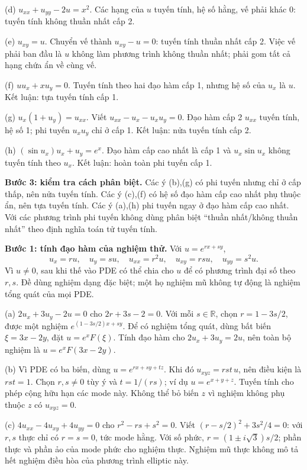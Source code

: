 (d) $u_{xx}+u_{yy}-2u=x^2$. Các hạng của $u$ tuyến tính, hệ số hằng, vế phải khác 0: tuyến tính không thuần nhất cấp 2.

(e) $u_{xy}=u$. Chuyển vế thành $u_{xy}-u=0$: tuyến tính thuần nhất cấp 2. Việc vế phải ban đầu là $u$ không làm phương trình không thuần nhất; phải gom tất cả hạng chứa ẩn về cùng vế.

(f) $uu_x+xu_y=0$. Tuyến tính theo hai đạo hàm cấp 1, nhưng hệ số của $u_x$ là $u$. Kết luận: tựa tuyến tính cấp 1.

(g) $u_x(1+u_y)=u_{xx}$. Viết $u_{xx}-u_x-u_xu_y=0$. Đạo hàm cấp 2 $u_{xx}$ tuyến tính, hệ số 1; phi tuyến $u_xu_y$ chỉ ở cấp 1. Kết luận: nửa tuyến tính cấp 2.

(h) $(\sin u_x)u_x+u_y=e^x$. Đạo hàm cấp cao nhất là cấp 1 và $u_x\sin u_x$ không tuyến tính theo $u_x$. Kết luận: hoàn toàn phi tuyến cấp 1.

\textbf{Bước 3: kiểm tra cách phân biệt.} Các ý (b),(g) có phi tuyến nhưng chỉ ở cấp thấp, nên nửa tuyến tính. Các ý (c),(f) có hệ số đạo hàm cấp cao nhất phụ thuộc ẩn, nên tựa tuyến tính. Các ý (a),(h) phi tuyến ngay ở đạo hàm cấp cao nhất. Với các phương trình phi tuyến không dùng phân biệt ``thuần nhất/không thuần nhất'' theo định nghĩa toán tử tuyến tính.

\textbf{Bước 1: tính đạo hàm của nghiệm thử.} Với $u=e^{rx+sy}$,
\[u_x=ru,\quad u_y=su,\quad u_{xx}=r^2u,\quad u_{xy}=rsu,\quad u_{yy}=s^2u.\]
Vì $u\ne0$, sau khi thế vào PDE có thể chia cho $u$ để có phương trình đại số theo $r,s$. Đề dùng nghiệm dạng đặc biệt; một họ nghiệm mũ không tự động là nghiệm tổng quát của mọi PDE.

(a) $2u_x+3u_y-2u=0$ cho $2r+3s-2=0$. Với mỗi $s\in\mathbb R$, chọn $r=1-3s/2$, được một nghiệm $e^{(1-3s/2)x+sy}$. Để có nghiệm tổng quát, dùng bất biến $\xi=3x-2y$, đặt $u=e^xF(\xi)$. Tính đạo hàm cho $2u_x+3u_y=2u$, nên toàn bộ nghiệm là $u=e^xF(3x-2y)$.

(b) Vì PDE có ba biến, dùng $u=e^{rx+sy+tz}$. Khi đó $u_{xyz}=rst\,u$, nên điều kiện là $rst=1$. Chọn $r,s\ne0$ tùy ý và $t=1/(rs)$; ví dụ $u=e^{x+y+z}$. Tuyến tính cho phép cộng hữu hạn các mode này. Không thể bỏ biến $z$ vì nghiệm không phụ thuộc $z$ có $u_{xyz}=0$.

(c) $4u_{xx}-4u_{xy}+4u_{yy}=0$ cho $r^2-rs+s^2=0$. Viết $(r-s/2)^2+3s^2/4=0$: với $r,s$ thực chỉ có $r=s=0$, tức mode hằng. Với số phức, $r=(1\pm i\sqrt3)s/2$; phần thực và phần ảo của mode phức cho nghiệm thực. Nghiệm mũ thực không mô tả hết nghiệm điều hòa của phương trình elliptic này.

